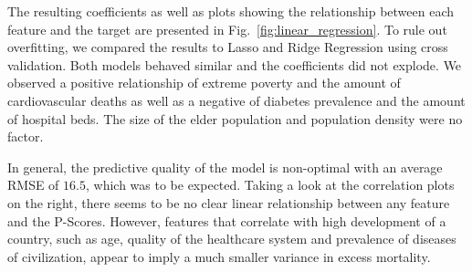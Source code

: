 \documentclass{article}
\newcommand{\figref}[1]{Fig.~\ref{#1}}
\begin{document}
The resulting coefficients as well as plots showing the relationship between each feature and the target are presented in \figref{fig:linear_regression}. To rule out overfitting, we compared the results to Lasso and Ridge Regression using cross validation. Both models behaved similar and the coefficients did not explode. We observed a positive relationship of extreme poverty and the amount of cardiovascular deaths as well as a negative of diabetes prevalence and the amount of hospital beds. The size of the elder population and population density were no factor. 

In general, the predictive quality of the model is non-optimal with an average RMSE of $16.5$, which was to be expected. Taking a look at the correlation plots on the right, there seems to be no clear linear relationship between any feature and the P-Scores. However, features that correlate with high development of a country, such as age, quality of the healthcare system and prevalence of diseases of civilization, appear to imply a much smaller variance in excess mortality.

\end{document}
